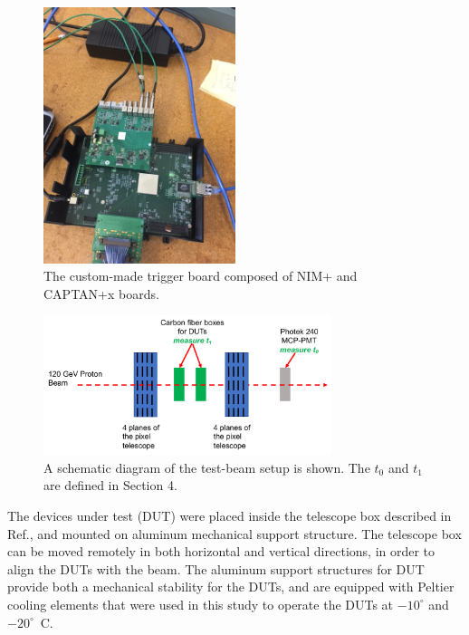 \documentclass[preprint,1p]{elsarticle}
\begin{document}
\begin{figure}[htbp] 
\centering
\includegraphics[width=0.5\textwidth, angle=270]{figs/CAPTAN_NIM_Plus.JPG} 
\caption{The custom-made trigger board composed of NIM+ and CAPTAN+x boards.} 
\label{fig:NIM+Captan} 
\end{figure} 




\begin{figure}[htbp] 
\centering
\includegraphics[width=0.75\textwidth]{figs/BeamSetup.pdf} 
\caption{A schematic diagram of the test-beam setup is shown. The $t_0$ and $t_1$ are defined in Section 4.} 
\label{fig:DragonBoxDiagram} 
\end{figure} 

The devices under test (DUT) were placed inside the telescope box described in
Ref.\cite{KWAN2016162}, and mounted on aluminum mechanical support structure.
The telescope box can be moved remotely in both horizontal and vertical
directions, in order to align the DUTs with the beam. The aluminum support
structures for DUT provide both a mechanical stability for the DUTs, and are
equipped with Peltier cooling elements that were used in this study to operate
the DUTs at $-10^{\circ}$ and $-20^{\circ}$~C.
\end{document}
